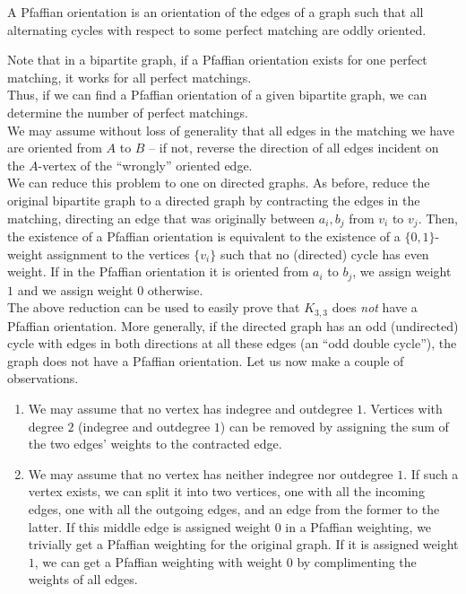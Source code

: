 \begin{fdef}
	A Pfaffian orientation is an orientation of the edges of a graph such that all alternating cycles with respect to some perfect matching are oddly oriented. 
\end{fdef}
Note that in a bipartite graph, if a Pfaffian orientation exists for one perfect matching, it works for all perfect matchings.\\

Thus, if we can find a Pfaffian orientation of a given bipartite graph, we can determine the number of perfect matchings.\\
We may assume without loss of generality that all edges in the matching we have are oriented from $A$ to $B$ -- if not, reverse the direction of all edges incident on the $A$-vertex of the ``wrongly'' oriented edge.\\
We can reduce this problem to one on directed graphs. As before, reduce the original bipartite graph to a directed graph by contracting the edges in the matching, directing an edge that was originally between $a_i,b_j$ from $v_i$ to $v_j$. Then, the existence of a Pfaffian orientation is equivalent to the existence of a $\{0,1\}$-weight assignment to the vertices $\{v_i\}$ such that no (directed) cycle has even weight. If in the Pfaffian orientation it is oriented from $a_i$ to $b_j$, we assign weight $1$ and we assign weight $0$ otherwise.\\
The above reduction can be used to easily prove that $K_{3,3}$ does \emph{not} have a Pfaffian orientation. More generally, if the directed graph has an odd (undirected) cycle with edges in both directions at all these edges (an ``odd double cycle''), the graph does not have a Pfaffian orientation. Let us now make a couple of observations.
\begin{enumerate}
	\item We may assume that no vertex has indegree and outdegree $1$. Vertices with degree $2$ (indegree and outdegree $1$) can be removed by assigning the sum of the two edges' weights to the contracted edge.
	\item We may assume that no vertex has neither indegree nor outdegree $1$. If such a vertex exists, we can split it into two vertices, one with all the incoming edges, one with all the outgoing edges, and an edge from the former to the latter. If this middle edge is assigned weight $0$ in a Pfaffian weighting, we trivially get a Pfaffian weighting for the original graph. If it is assigned weight $1$, we can get a Pfaffian weighting with weight $0$ by complimenting the weights of all edges.
\end{enumerate}

